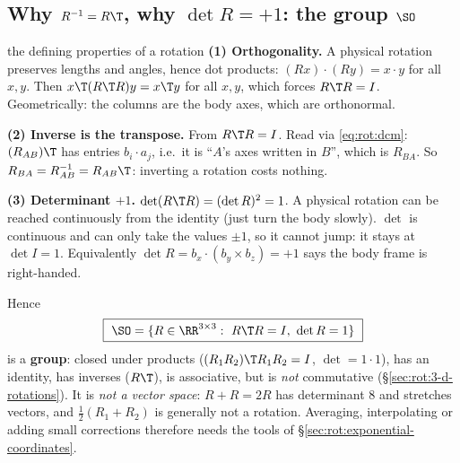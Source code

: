 \subsection{Why $R^{-1}=R\T$, why $\det R=+1$: the group $\SO$}\label{sec:rot:group}
\begin{deriv}{the defining properties of a rotation}
\textbf{(1) Orthogonality.} A physical rotation preserves lengths and angles, hence dot products: $(Rx)\cdot(Ry)=x\cdot y$ for all $x,y$. Then $x\T(R\T R)y=x\T y$ for all $x,y$, which forces $R\T R=I$. Geometrically: the columns are the body axes, which are orthonormal.

\textbf{(2) Inverse is the transpose.} From $R\T R=I$. Read via \eqref{eq:rot:dcm}: $(R_{AB})\T$ has entries $b_i\cdot a_j$, i.e.\ it is ``$A$'s axes written in $B$'', which is $R_{BA}$. So $R_{BA}=R_{AB}^{-1}=R_{AB}\T$: inverting a rotation costs nothing.

\textbf{(3) Determinant $+1$.} $\det(R\T R)=(\det R)^2=1$. A physical rotation can be reached continuously from the identity (just turn the body slowly). $\det$ is continuous and can only take the values $\pm1$, so it cannot jump: it stays at $\det I=1$. Equivalently $\det R=b_x\cdot(b_y\times b_z)=+1$ says the body frame is right-handed.
\end{deriv}
Hence
\[
\boxed{\ \SO=\{R\in\RR^{3\times3}:\ R\T R=I,\ \det R=1\}\ }
\]
is a \textbf{group}: closed under products ($(R_1R_2)\T R_1R_2=I$, $\det=1\cdot1$), has an identity, has inverses ($R\T$), is associative, but is \emph{not} commutative (\S\ref{sec:rot:3-d-rotations}). It is \emph{not a vector space}: $R+R=2R$ has determinant 8 and stretches vectors, and $\frac12(R_1+R_2)$ is generally not a rotation. Averaging, interpolating or adding small corrections therefore needs the tools of \S\ref{sec:rot:exponential-coordinates}.

